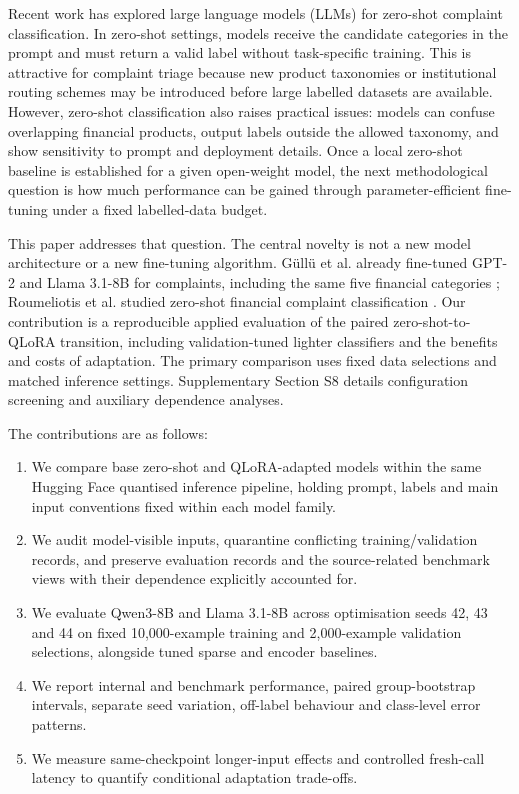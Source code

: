 \documentclass{elektr}
\begin{document}
Recent work has explored large language models (LLMs) for zero-shot complaint classification. In zero-shot settings, models receive the candidate categories in the prompt and must return a valid label without task-specific training. This is attractive for complaint triage because new product taxonomies or institutional routing schemes may be introduced before large labelled datasets are available. However, zero-shot classification also raises practical issues: models can confuse overlapping financial products, output labels outside the allowed taxonomy, and show sensitivity to prompt and deployment details. Once a local zero-shot baseline is established for a given open-weight model, the next methodological question is how much performance can be gained through parameter-efficient fine-tuning under a fixed labelled-data budget.

This paper addresses that question. The central novelty is not a new model architecture or a new fine-tuning algorithm. G\"ull\"u et al. already fine-tuned GPT-2 and Llama 3.1-8B for complaints, including the same five financial categories \cite{gullu2025complaintllm}; Roumeliotis et al. studied zero-shot financial complaint classification \cite{roumeliotis2025think}. Our contribution is a reproducible applied evaluation of the paired zero-shot-to-QLoRA transition, including validation-tuned lighter classifiers and the benefits and costs of adaptation. The primary comparison uses fixed data selections and matched inference settings. Supplementary Section S8 details configuration screening and auxiliary dependence analyses.

The contributions are as follows:
\begin{enumerate}
    \item We compare base zero-shot and QLoRA-adapted models within the same Hugging Face quantised inference pipeline, holding prompt, labels and main input conventions fixed within each model family.
    \item We audit model-visible inputs, quarantine conflicting training/validation records, and preserve evaluation records and the source-related benchmark views with their dependence explicitly accounted for.
    \item We evaluate Qwen3-8B and Llama 3.1-8B across optimisation seeds 42, 43 and 44 on fixed 10,000-example training and 2,000-example validation selections, alongside tuned sparse and encoder baselines.
    \item We report internal and benchmark performance, paired group-bootstrap intervals, separate seed variation, off-label behaviour and class-level error patterns.
    \item We measure same-checkpoint longer-input effects and controlled fresh-call latency to quantify conditional adaptation trade-offs.
\end{enumerate}
\end{document}
